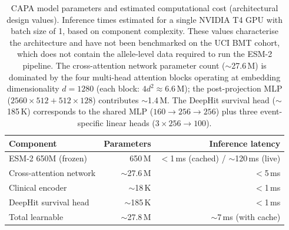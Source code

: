 \documentclass[12pt]{article}
\begin{document}
\begin{table}[htbp]
  \caption{CAPA model parameters and estimated computational cost (architectural
    design values).  Inference times estimated for a single NVIDIA T4 GPU with
    batch size of 1, based on component complexity.  These values characterise
    the architecture and have not been benchmarked on the UCI BMT cohort, which
    does not contain the allele-level data required to run the ESM-2 pipeline.
    The cross-attention network parameter count ($\sim$27.6\,M) is dominated
    by the four multi-head attention blocks operating at embedding dimensionality
    $d = 1280$ (each block: $4d^2 \approx 6.6\,\text{M}$); the post-projection
    MLP ($2560 \times 512 + 512 \times 128$) contributes $\sim$1.4\,M.
    The DeepHit survival head ($\sim$185\,K) corresponds to the shared MLP
    ($160 \to 256 \to 256$) plus three event-specific linear heads
    ($3 \times 256 \to 100$).}
  \label{tab:compute}
  \centering
  \begin{tabular}{lrr}
    \toprule
    \textbf{Component} & \textbf{Parameters} & \textbf{Inference latency} \\
    \midrule
    ESM-2 650M (frozen) & 650\,M & $<$1\,ms (cached) / $\sim$120\,ms (live) \\
    Cross-attention network & $\sim$27.6\,M & $<$5\,ms \\
    Clinical encoder & $\sim$18\,K & $<$1\,ms \\
    DeepHit survival head & $\sim$185\,K & $<$1\,ms \\
    \midrule
    Total learnable & $\sim$27.8\,M & $\sim$7\,ms (with cache) \\
    \bottomrule
  \end{tabular}
\end{table}
\end{document}
